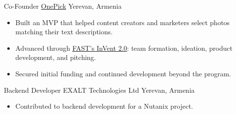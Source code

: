 \documentclass[10pt,a4paper,sans]{moderncv}        %
\newcommand{\yerevan}{Yerevan, Armenia}
\begin{document}
{Co-Founder}
{\href{https://www.crunchbase.com/organization/onepick-me\#overview}{OnePick}}
{\yerevan}
{}
{
  \begin{itemize}
    \item Built an MVP that helped content creators and marketers select photos matching their text descriptions.
    \item Advanced through \href{https://fast.foundation/en/program/857/2023/general-information}{FAST's InVent 2.0}: team formation, ideation, product development, and pitching.
    \item Secured initial funding and continued development beyond the program.
  \end{itemize}
} %

{Backend Developer}
{EXALT Technologies Ltd}
{\yerevan}
{}
{
  \begin{itemize}
  \item Contributed to backend development for a Nutanix project.
  \end{itemize}
} %
\end{document}
